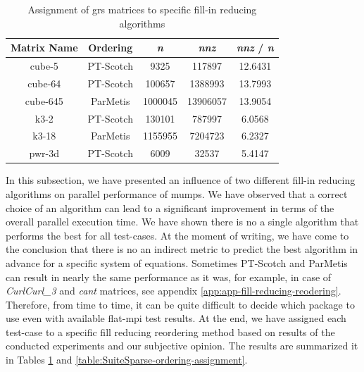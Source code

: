 \begin{table}[!htpb]
\centering
\begin{tabular}{|c|c|c|c|c|}
\hline
Matrix Name & Ordering  & \textit{n}       & \textit{nnz}      & \textit{nnz} / \textit{n} \\ \hline
cube-5      & PT-Scotch & 9325    & 117897   & 12.6431 \\ \hline
cube-64     & PT-Scotch & 100657  & 1388993  & 13.7993 \\ \hline
cube-645    & ParMetis  & 1000045 & 13906057 & 13.9054 \\ \hline
k3-2        & PT-Scotch & 130101  & 787997   & 6.0568  \\ \hline
k3-18       & ParMetis  & 1155955 & 7204723  & 6.2327  \\ \hline
pwr-3d      & PT-Scotch & 6009    & 32537    & 5.4147  \\ \hline
\end{tabular}
\caption{Assignment of \acrshort{grs} matrices to specific fill-in reducing algorithms}
\label{table:GRS-ordering-assignment}
\end{table}


In this subsection, we have presented an influence of  two different fill-in reducing algorithms on parallel performance of \acrshort{mumps}. We have observed that a correct choice of an algorithm can lead to a significant improvement in terms of the overall parallel execution time. We have shown there is no a single algorithm that performs the best for all test-cases. At the moment of writing, we have come to the conclusion that there is no an indirect metric to predict the best algorithm in advance for a specific system of equations. Sometimes PT-Scotch and ParMetis can result in nearly the same performance as it was, for example, in case of \textit{CurlCurl\_3} and \textit{cant} matrices, see appendix \ref{app:app-fill-reducing-reodering}. Therefore, from time to time, it can be quite difficult to decide which package to use even with available flat-\acrshort{mpi} test results. At the end, we have assigned each test-case to a specific fill reducing reordering method based on results of the conducted experiments and our subjective opinion. The results are summarized it in Tables \ref{table:GRS-ordering-assignment} and \ref{table:SuiteSparse-ordering-assignment}. \\ 


